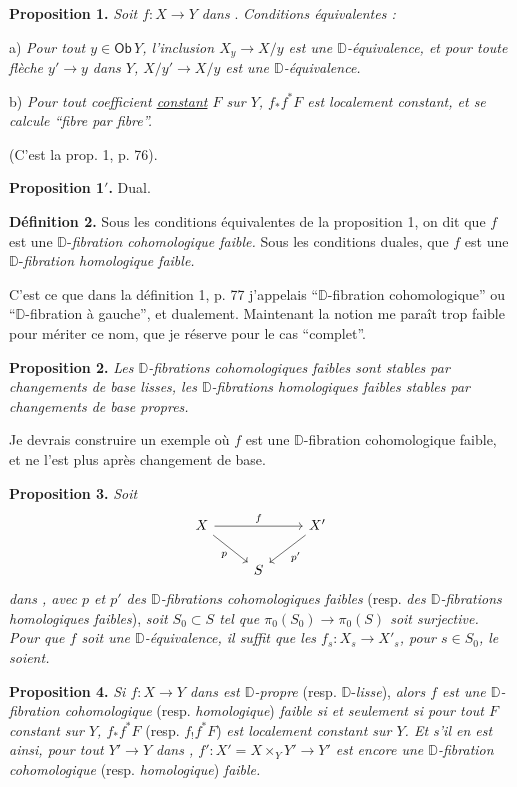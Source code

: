\documentclass[11pt,leqno]{article}
\newcommand{\printedpage}[1]{\marginpar{\footnotesize p.~#1}}
\newcommand{\msp}[1]{\marginpar{\footnotesize [#1]}}
\newcommand{\DD}{\mathbb{D}}
\newcommand{\Dia}{\mathsf{Dia}}
\newcommand{\D}{\mathbb{D}}
\begin{document}
\textbf{Proposition 1.} \textit{Soit $f : X \to Y$ dans} \Dia. \textit{Conditions équivalentes :}

a) \textit{Pour tout $y \in \mathsf{Ob}\, Y$, l'inclusion $X_y \to X/y$ est une $\DD$-équivalence, et pour toute flèche $y' \to y$ dans $Y$, $X/y' \to X/y$ est une $\DD$-équivalence.}

b) \textit{Pour tout coefficient \underline{constant} $F$ sur $Y$, $f_{*}f^{*}F$ est localement constant, et se calcule “fibre par fibre”.}

(C'est la prop. 1, p. 76).

\textbf{Proposition 1$'$.} Dual.

\msp{page 116}

\textbf{Définition 2.} Sous les conditions équivalentes de la proposition 1, on dit que $f$ est une $\DD$-\textit{fibration cohomologique faible.} Sous les conditions duales, que $f$ est une $\DD$-\textit{fibration homologique faible.}

C'est ce que dans la définition 1, p. 77 j'appelais “$\DD$-fibration cohomologique” ou “$\DD$-fibration à gauche”, et dualement. Maintenant la notion me paraît trop faible pour mériter ce nom, que je réserve pour le cas “complet”.

\textbf{Proposition 2.} \textit{Les $\DD$-fibrations cohomologiques faibles sont stables par changements de base lisses, les $\DD$-fibrations homologiques faibles stables par changements de base propres.}

Je devrais construire un exemple où $f$ est une $\DD$-fibration cohomologique faible, et ne l'est plus après changement de base.

\printedpage{69}

\textbf{Proposition 3.} \textit{Soit}
\[
\begin{tikzcd}
X \arrow[rr, "f"] \arrow[dr, "p"'] & & X' \arrow[dl, "p'"] \\
& S &
\end{tikzcd}
\]
\textit{dans \Dia, avec $p$ et $p'$ des $\D$-fibrations cohomologiques faibles} (resp. \textit{des $\D$-fibrations homologiques faibles}), \textit{soit $S_0 \subset S$ tel que $\pi_0(S_0) \to \pi_0(S)$ soit surjective. Pour que $f$ soit une $\D$-équivalence, il suffit que les $f_s : X_s \to X'_s$, pour $s \in S_0$, le soient.}

\textbf{Proposition 4.} \textit{Si $f : X \to Y$ dans \Dia{} est $\D$-propre} (resp. $\D$-\textit{lisse}), \textit{alors $f$ est une $\D$-fibration cohomologique} (resp. \textit{homologique}) \textit{faible si et seulement si pour tout $F$ constant sur $Y$, $f_*f^*F$} (resp. $f_!f^*F$) \textit{est localement constant sur $Y$. Et s'il en est ainsi, pour tout $Y' \to Y$ dans \Dia, $f' : X' = X \times_Y Y' \to Y'$ est encore une $\D$-fibration cohomologique} (resp. \textit{homologique}) \textit{faible.}
\end{document}
